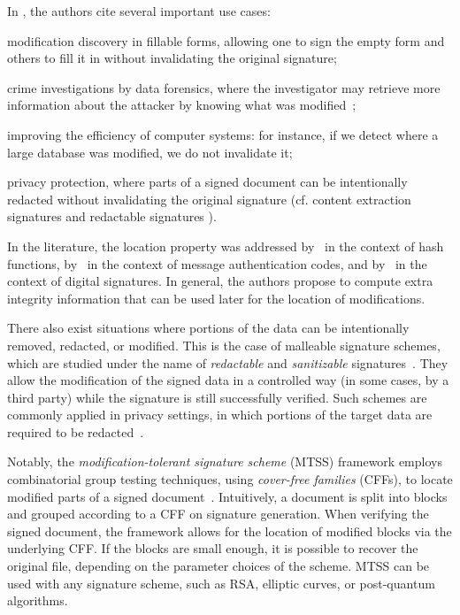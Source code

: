 \documentclass[12pt]{article}
\begin{document}
In \cite{mlss-idalino-2015}, the authors cite several important use cases:
\begin{enumerate*}[(i)]
  \item modification discovery in fillable forms, allowing one to sign the empty form and others to fill it in without invalidating the original signature; 
  \item crime investigations by data forensics, where the investigator may retrieve more information about the attacker by knowing what was modified~\cite{index-data-attacker-goodrich-2005};
  \item improving the efficiency of computer systems: for instance, if we detect where a large database was modified, we do not invalidate it;
  \item privacy protection, where parts of a signed document can be intentionally redacted without invalidating the original signature (cf. content extraction signatures \cite{content-extraction-signature-steinfeld-2002} and redactable signatures \cite{homomorphic-signatures-johnson-2002, redactable-signatures-haber-2008}).
\end{enumerate*}

In the literature, the location property was addressed by~\cite{group-testing-hash-functions-de-bonis-2011,group-testing-hash-functions-de-bonis-2011-2} in the context of hash functions, by~\cite{message-authentication-de-crescenzo-2004,message-authentication-goodrich-2005} in the context of message authentication codes, and by~\cite{mlss-idalino-2015,mtss-idalino-2019} in the context of digital signatures. In general, the authors propose to compute extra integrity information that can be used later for the location of modifications.

There also exist situations where portions of the data can be intentionally removed, redacted, or modified. This is the case of malleable signature schemes, which are studied under the name of \emph{redactable} and \emph{sanitizable} signatures~\cite{position-signatures-bilzhause-2017}. They allow the modification of the signed data in a controlled way (in some cases, by a third party) while the signature is still successfully verified. Such schemes are commonly applied in privacy settings, in which portions of the target data are required to be redacted~\cite{homomorphic-signatures-johnson-2002, redactable-signatures-haber-2008, redactable-signatures-lim-2011}.

Notably, the \emph{modification-tolerant signature scheme} (MTSS) framework employs combinatorial group testing techniques, using \textit{cover-free families} (CFFs), to locate modified parts of a signed document~\cite{mtss-idalino-2019}. Intuitively, a document is split into blocks and grouped according to a CFF on signature generation. When verifying the signed document, the framework allows for the location of modified blocks via the underlying CFF. If the blocks are small enough, it is possible to recover the original file, depending on the parameter choices of the scheme. MTSS can be used with any signature scheme, such as RSA, elliptic curves, or post-quantum algorithms.
\end{document}
